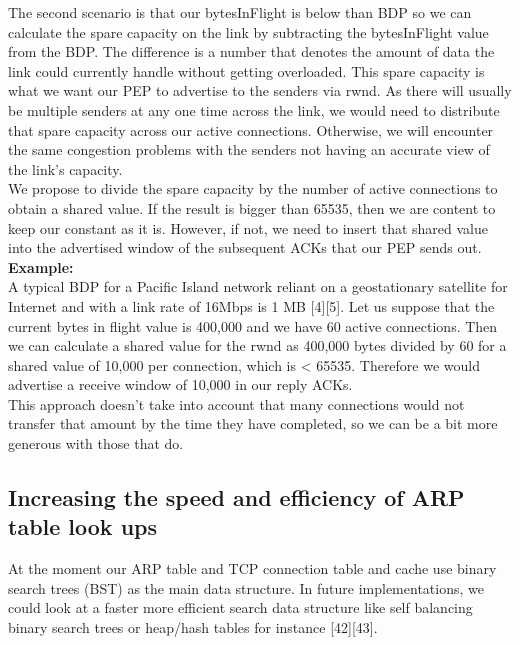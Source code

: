 The second scenario is that our bytesInFlight is below than BDP so we can calculate the spare capacity on the link by subtracting the bytesInFlight value from the BDP. The difference is a number that denotes the amount of data the link could currently handle without getting overloaded. This spare capacity is what we want our PEP to advertise to the senders via rwnd. As there will usually be multiple senders at any one time across the link, we would need to distribute that spare capacity across our active connections. Otherwise, we will encounter the same congestion problems with the senders not having an accurate view of the link's capacity.\\

We propose to divide the spare capacity by the number of active connections to obtain a shared value. If the result is bigger than 65535, then we are content to keep our constant as it is. However, if not, we need to insert that shared value into the advertised window of the subsequent ACKs that our PEP sends out. \\

\textbf{Example:}\\

A typical BDP for a Pacific Island network reliant on a geostationary satellite for Internet and with a link rate of 16Mbps is 1 MB [4][5]. Let us suppose that the current bytes in flight value is 400,000 and we have 60 active connections. Then we can calculate a shared value for the rwnd as 400,000 bytes divided by 60 for a shared value of 10,000 per connection, which is < 65535. Therefore we would advertise a receive window of 10,000 in our reply ACKs.\\

This approach doesn't take into account that many connections would not transfer that amount by the time they have completed, so we can be a bit more generous with those that do.
 
 \subsection{Increasing the speed and efficiency of ARP table look ups}
At the moment our ARP table and TCP connection table and cache use binary search trees (BST) as the main data structure. In future implementations, we could look at a faster more efficient search data structure like self balancing binary search trees or heap/hash tables for instance [42][43]. \\

